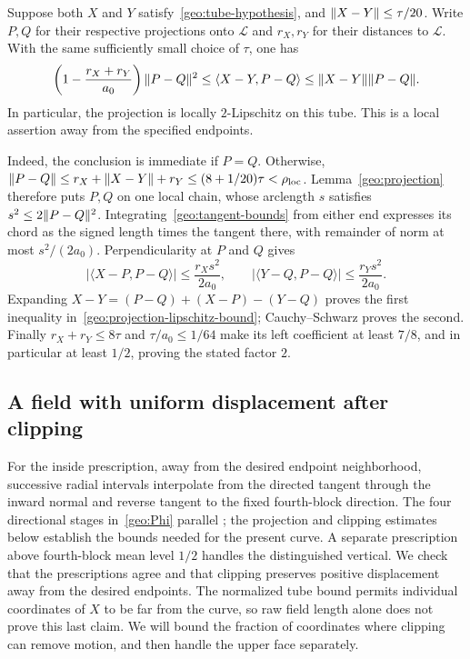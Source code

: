 \begin{remark}
\label{geo:projection-lipschitz}
Suppose both $X$ and $Y$ satisfy~\eqref{geo:tube-hypothesis}, and
$\lVert X-Y\rVert\le\tau/20$. Write $P,Q$ for their respective projections
onto $\mathcal L$ and $r_X,r_Y$ for their distances to $\mathcal L$.
With the same sufficiently small choice of $\tau$, one has
\begin{equation}\label{geo:projection-lipschitz-bound}
 \left(1-\frac{r_X+r_Y}{a_0}\right)\lVert P-Q\rVert^2
 \le \langle X-Y,P-Q\rangle
 \le \lVert X-Y\rVert\lVert P-Q\rVert.
\end{equation}
In particular, the projection is locally $2$-Lipschitz on this tube.
This is a local assertion away from the specified endpoints.

Indeed, the conclusion is immediate if $P=Q$. Otherwise,
$\lVert P-Q\rVert\le r_X+\lVert X-Y\rVert+r_Y\le(8+1/20)\tau<\rho_{\rm loc}$.
Lemma~\ref{geo:projection} therefore puts $P,Q$ on one local chain,
whose arclength $s$ satisfies $s^2\le2\lVert P-Q\rVert^2$.
Integrating~\eqref{geo:tangent-bounds} from either end expresses its
chord as the signed length times the tangent there, with remainder
of norm at most $s^2/(2a_0)$. Perpendicularity at $P$ and $Q$ gives
\[
 \big|\langle X-P,P-Q\rangle\big|
       \le\frac{r_Xs^2}{2a_0},\qquad
 \big|\langle Y-Q,P-Q\rangle\big|
       \le\frac{r_Ys^2}{2a_0}.
\]
Expanding $X-Y=(P-Q)+(X-P)-(Y-Q)$ proves the first inequality
in~\eqref{geo:projection-lipschitz-bound}; Cauchy--Schwarz proves
the second. Finally $r_X+r_Y\le8\tau$ and $\tau/a_0\le1/64$
make its left coefficient at least $7/8$, and in particular at least
$1/2$, proving the stated factor $2$.
\end{remark}

\subsection{A field with uniform displacement after clipping}

For the inside prescription, away from the desired endpoint neighborhood,
successive radial intervals interpolate from the directed tangent through
the inward normal and reverse tangent to the fixed fourth-block direction.
The four directional stages in~\eqref{geo:Phi} parallel
\cite[Equation~(1)]{Rubinstein2016Settling}; the projection and clipping estimates
below establish the bounds needed for the present curve.
A separate prescription above fourth-block mean level $1/2$ handles the
distinguished vertical. We check that the prescriptions agree and that
clipping preserves positive displacement away from the desired endpoints.
The normalized tube bound permits individual coordinates of $X$ to be
far from the curve, so raw field length alone does not prove this last
claim. We will bound the fraction of coordinates where clipping can
remove motion, and then handle the upper face separately.
\label{geo:field}

